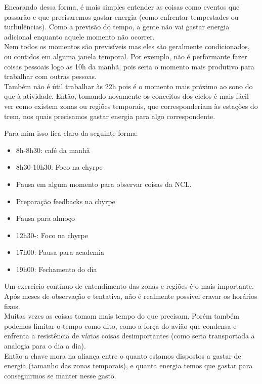 \documentclass[11pt]{article}
\begin{document}
Encarando dessa forma, é mais simples entender as coisas como eventos que passarão e que precisaremos gastar energia (como enfrentar tempestades ou turbulências). Como a previsão do tempo, a gente não vai gastar energia adicional enquanto aquele momento não ocorrer.\\

Nem todos os momentos são previsíveis mas eles são geralmente condicionados, ou contidos em alguma janela temporal. Por exemplo, não é performante fazer coisas pessoais logo as 10h da manhã, pois seria o momento mais produtivo para trabalhar com outras pessoas.\\

Também não é útil trabalhar às 22h pois é o momento mais próximo ao sono do que à atividade. Então, tomando novamente os conceitos dos ciclos é mais fácil ver como existem zonas ou regiões temporais, que corresponderiam às estações do trem, nos quais precisamos gastar energia para algo correspondente.

Para mim isso fica claro da seguinte forma:

\begin{itemize}
    \item 8h-8h30: café da manhã 
    \item 8h30-10h30: Foco na chyrpe
    \item Pausa em algum momento para observar coisas da NCL.
    \item Preparação feedbacks na chyrpe
    \item Pausa para almoço
    \item 12h30-: Foco na chyrpe
    \item 17h00: Pausa para academia
    \item 19h00: Fechamento do dia
    
\end{itemize}

Um exercício contínuo de entendimento das zonas e regiões é o mais importante. Após meses de observação e tentativa, não é realmente possível cravar os horários fixos.\\

Muitas vezes as coisas tomam mais tempo do que precisam. Porém também podemos limitar o tempo como dito, como a força do avião que condensa e enfrenta a resistência de várias coisas desimportantes (como seria transportada a analogia para o dia a dia). \\

Então a chave mora na aliança entre o quanto estamos dispostos a gastar de energia (tamanho das zonas temporais), e quanta energia temos que gastar para conseguirmos se manter nesse gasto.\\
\end{document}

